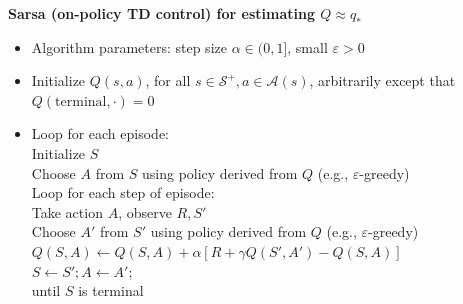 \textbf{Sarsa (on-policy TD control) for estimating $Q \approx q_*$}
\begin{itemize}[leftmargin=*]
	\item[] Algorithm parameters: step size $\alpha \in (0, 1]$, small $\varepsilon > 0$
	\item[] Initialize $Q(s, a)$, for all $s \in \mathcal{S}^+, a \in \mathcal{A}(s)$, arbitrarily except that $Q(\text{terminal}, \cdot) = 0$

	\item[] Loop for each episode:\\
	      Initialize $S$\\
	      Choose $A$ from $S$ using policy derived from $Q$ (e.g., $\varepsilon$-greedy)\\
	      Loop for each step of episode:\\
	      \hspace*{1em} Take action $A$, observe $R, S'$\\
	      \hspace*{1em} Choose $A'$ from $S'$ using policy derived from $Q$ (e.g., $\varepsilon$-greedy)\\
	      \hspace*{1em} $Q(S, A) \leftarrow Q(S, A) + \alpha [R + \gamma Q(S', A') - Q(S, A)]$\\
	      \hspace*{1em} $S \leftarrow S'; A \leftarrow A';$\\
	      until $S$ is terminal
\end{itemize}
